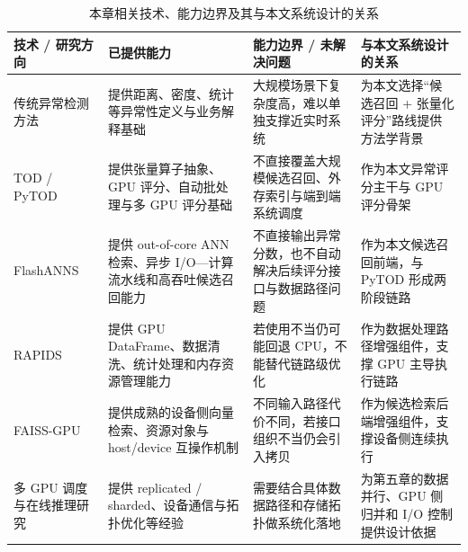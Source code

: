 \begin{table}[htbp]
  \caption{本章相关技术、能力边界及其与本文系统设计的关系}
  \label{tab:chapter2-summary}
  \centering
  \small
  \setlength{\tabcolsep}{3pt}
  \renewcommand{\arraystretch}{1.25}
  \begin{tabularx}{\linewidth}{@{}P{2.2cm}Y Y Y@{}}
    \toprule
    技术 / 研究方向 & 已提供能力 & 能力边界 / 未解决问题 & 与本文系统设计的关系 \\
    \midrule
    传统异常检测方法 & 提供距离、密度、统计等异常性定义与业务解释基础 & 大规模场景下复杂度高，难以单独支撑近实时系统 & 为本文选择“候选召回 + 张量化评分”路线提供方法学背景 \\
    TOD / PyTOD & 提供张量算子抽象、GPU 评分、自动批处理与多 GPU 评分基础 & 不直接覆盖大规模候选召回、外存索引与端到端系统调度 & 作为本文异常评分主干与 GPU 评分骨架 \\
    FlashANNS & 提供 out-of-core ANN 检索、异步 I/O---计算流水线和高吞吐候选召回能力 & 不直接输出异常分数，也不自动解决后续评分接口与数据路径问题 & 作为本文候选召回前端，与 PyTOD 形成两阶段链路 \\
    RAPIDS & 提供 GPU DataFrame、数据清洗、统计处理和内存资源管理能力 & 若使用不当仍可能回退 CPU，不能替代链路级优化 & 作为数据处理路径增强组件，支撑 GPU 主导执行链路 \\
    FAISS-GPU & 提供成熟的设备侧向量检索、资源对象与 host/device 互操作机制 & 不同输入路径代价不同，若接口组织不当仍会引入拷贝 & 作为候选检索后端增强组件，支撑设备侧连续执行 \\
    多 GPU 调度与在线推理研究 & 提供 replicated / sharded、设备通信与拓扑优化等经验 & 需要结合具体数据路径和存储拓扑做系统化落地 & 为第五章的数据并行、GPU 侧归并和 I/O 控制提供设计依据 \\
    \bottomrule
  \end{tabularx}
\end{table}

